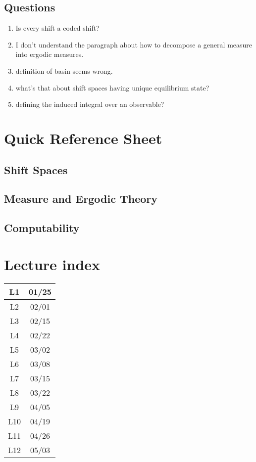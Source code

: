\documentclass[11pt, reqno]{amsart}
\theoremstyle{plain}
\numberwithin{thm}{subsection}
\theoremstyle{definition}
\begin{document}
\subsection{Questions}
\begin{enumerate}
  \item Is every shift a coded shift?
  \item I don't understand the paragraph about how to decompose a general measure into ergodic measures.
  \item definition of basin seems wrong.
  \item what's that about shift spaces having unique equilibrium state?
  \item defining the induced integral over an observable?
\end{enumerate}

\appendix
\section{Quick Reference Sheet}
\subsection{Shift Spaces}
\subsection{Measure and Ergodic Theory}
\subsection{Computability}

\section{Lecture index}  

\begin{tabular}{|c|c|}\hline
  L1 & 01/25 \\ \hline
  L2 & 02/01 \\ \hline
  L3 & 02/15 \\ \hline
  L4 & 02/22 \\ \hline
  L5 & 03/02 \\ \hline
  L6 & 03/08 \\ \hline
  L7 & 03/15 \\ \hline
  L8 & 03/22 \\ \hline
  L9 & 04/05 \\ \hline
  L10 & 04/19 \\ \hline
  L11 & 04/26 \\ \hline
  L12 & 05/03 \\ \hline
\end{tabular}

\printbibliography
\end{document}
